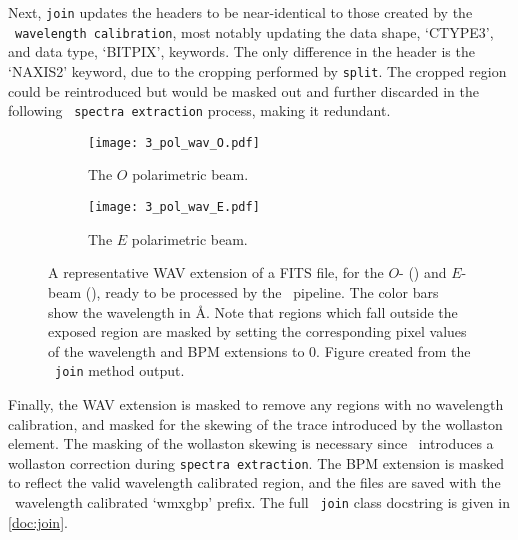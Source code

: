 Next, \texttt{join} updates the headers to be near-identical to those created by the \polsalt\ \texttt{wavelength calibration}, most notably updating the data shape, `CTYPE3', and data type, `BITPIX', keywords.
The only difference in the header is the  `NAXIS2' keyword, due to the cropping performed by \texttt{split}.
The cropped region could be reintroduced but would be masked out and further discarded in the following \polsalt\ \texttt{spectra extraction} process, making it redundant.

\begin{figure}[t]
    \centering
    \begin{subfigure}[b]{1.0 \textwidth}
        \centering
        \texttt{[image: 3\_pol\_wav\_O.pdf]}
        \caption{The $O$ polarimetric beam.}
        \label{subfig:pol_O}
    \end{subfigure}
    \centering
    \begin{subfigure}[b]{1.0\textwidth}
        \centering
        \texttt{[image: 3\_pol\_wav\_E.pdf]}
        \caption{The $E$ polarimetric beam.}
        \label{subfig:pol_E}
    \end{subfigure}
    \caption{
        A representative \gls{WAV} extension of a \gls{FITS} file, for the $O$- () and $E$-beam (), ready to be processed by the \polsalt\ pipeline.
        The color bars show the wavelength in \AA.
        Note that regions which fall outside the exposed region are masked by setting the corresponding pixel values of the wavelength and \gls{BPM} extensions to $0$.
        Figure created from the \stops\ \texttt{join} method output.
    }
    \label{fig:pol_wav_ext}
\end{figure}

Finally, the \gls{WAV} extension is masked to remove any regions with no wavelength calibration, and masked for the skewing of the trace introduced by the wollaston element.
The masking of the wollaston skewing is necessary since \polsalt\ introduces a wollaston correction during \texttt{spectra extraction}.
The \gls{BPM} extension is masked to reflect the valid wavelength calibrated region, and the files are saved with the \polsalt\ wavelength calibrated `wmxgbp' prefix.
The full \stops\ \texttt{join} class docstring is given in \autoref{doc:join}.

